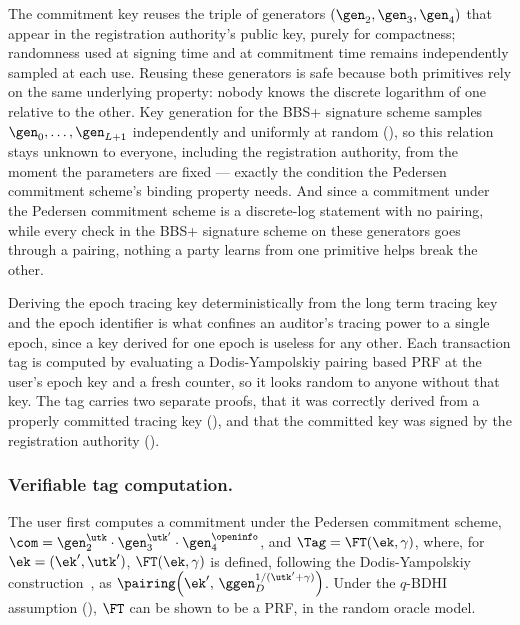 The commitment key reuses the triple of generators $(\gen_2,\gen_3,\gen_4)$
that appear in the registration authority's public key, purely for compactness;
randomness used at signing time and at commitment time remains independently
sampled at each use. Reusing these generators is safe because both primitives
rely on the same underlying property: nobody knows the discrete logarithm of
one relative to the other. Key generation for the BBS+ signature scheme samples
$\gen_0,\ldots,\gen_{L+1}$ independently and uniformly at random
(), so this relation stays unknown to everyone, including the
registration authority, from the moment the parameters are fixed --- exactly
the condition the Pedersen commitment scheme's binding property needs. And
since a commitment under the Pedersen commitment scheme is a discrete-log
statement with no pairing, while every check in the BBS+ signature scheme on
these generators goes through a pairing, nothing a party learns from one
primitive helps break the other.

Deriving the epoch tracing key deterministically from the long term tracing key
and the epoch identifier is what confines an auditor's tracing power to a
single epoch, since a key derived for one epoch is useless for any other. Each
transaction tag is computed by evaluating a Dodis-Yampolskiy pairing based PRF
at the user's epoch key and a fresh counter, so it looks random to anyone
without that key. The tag carries two separate proofs, that it was correctly
derived from a properly committed tracing key (), and
that the committed key was signed by the registration authority
().

\subsubsection*{Verifiable tag computation.}\label{sec:tag-computation} The
user first computes a commitment under the Pedersen commitment scheme, $\com =
\gen_2^{\utk}\cdot\gen_3^{\utk'}\cdot\gen_4^{\openinfo}$, and $\Tag = \FT(\ek,
\gamma)$, where, for $\ek = (\ek',\utk')$, $\FT(\ek, \gamma)$ is defined,
following the Dodis-Yampolskiy construction~\cite{PKC:DodYam05}, as
$\pairing\!\left(\ek',\, \ggen_D^{1/(\utk'+\gamma)}\right)$. Under the $q$-BDHI
assumption (), $\FT$ can be shown to be a PRF, in the random
oracle model.

